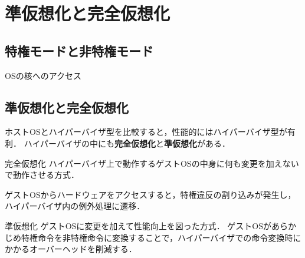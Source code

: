 \section{準仮想化と完全仮想化}
\tocc
\subsection{特権モードと非特権モード}
\begin{frame}{\ftitle}
    OSの核へのアクセス
\end{frame}
\subsection{準仮想化と完全仮想化}
\begin{frame}[t]{\ftitle}
    ホストOSとハイパーバイザ型を比較すると，性能的にはハイパーバイザ型が有利．
    ハイパーバイザの中にも\textbf{完全仮想化}と\textbf{準仮想化}がある．
    \begin{block}{完全仮想化}
        ハイパーバイザ上で動作するゲストOSの中身に何も変更を加えないで動作させる方式．
    \end{block}
    ゲストOSからハードウェアをアクセスすると，特権違反の割り込みが発生し，ハイパーバイザ内の例外処理に遷移．
\end{frame}
\begin{frame}[t]{\ftitle}
    \begin{block}{準仮想化}
        ゲストOSに変更を加えて性能向上を図った方式．
        ゲストOSがあらかじめ特権命令を非特権命令に変換することで，ハイパーバイザでの命令変換時にかかるオーバーヘッドを削減する．
    \end{block}
\end{frame}
